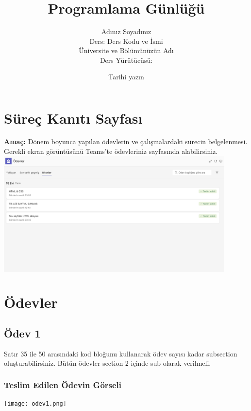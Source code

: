 \documentclass[a4paper,12pt]{article}
\title{\vspace{4cm}\bfseries Programlama Günlüğü}
\author{Adınız Soyadınız \\ \small{Ders: Ders Kodu ve İsmi}\\
\small{Üniversite ve Bölümünüzün Adı}\\
\small{Ders Yürütücüsü:}}
\date{Tarihi yazın}
\begin{document}
\maketitle
\thispagestyle{empty} %
\newpage


\tableofcontents

\newpage

\section{Süreç Kanıtı Sayfası}
\textbf{Amaç:} Dönem boyunca yapılan ödevlerin ve çalışmalardaki sürecin belgelenmesi. Gerekli ekran görüntüsünü Teams'te ödevleriniz sayfasında alabilirsiniz.\\

\includegraphics[width=0.9\textwidth]{sureckanit.png}
\section{Ödevler}
\subsection{Ödev 1}
Satır 35  ile 50 arasındaki kod bloğunu kullanarak ödev sayısı kadar subsection oluşturabilirsiniz. Bütün ödevler section 2 içinde sub olarak verilmeli.
\subsubsection{Teslim Edilen Ödevin Görseli}
\texttt{[image: odev1.png]}
\end{document}

